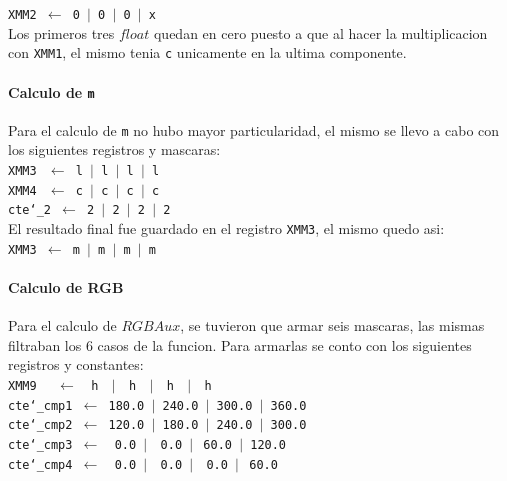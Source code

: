 \noindent
\texttt{XMM2 $\gets$ 0 $\vert$ 0 $\vert$ 0 $\vert$ x}\\

Los primeros tres $float$ quedan en cero puesto a que al hacer la multiplicacion con \texttt{XMM1}, el mismo tenia \texttt{c} unicamente en la ultima componente.

\paragraph{Calculo de \texttt{m}\newline}

Para el calculo de \texttt{m} no hubo mayor particularidad, el mismo se llevo a cabo con los siguientes registros y mascaras:\\

\noindent
\texttt{XMM3 $\ \gets$ l $\vert$ l $\vert$ l $\vert$ l}\\
\texttt{XMM4 $\ \gets$ c $\vert$ c $\vert$ c $\vert$ c}\\
\texttt{cte\char`_2 $\gets$ 2 $\vert$ 2 $\vert$ 2 $\vert$ 2}\\

El resultado final fue guardado en el registro \texttt{XMM3}, el mismo quedo asi:\\

\noindent
\texttt{XMM3 $\gets$ m $\vert$ m $\vert$ m $\vert$ m}\\

\paragraph{Calculo de RGB\newline}

Para el calculo de $RGBAux$, se tuvieron que armar seis mascaras, las mismas filtraban los 6 casos de la funcion. Para armarlas se conto con los siguientes registros y constantes:\\

\noindent
\texttt{XMM9 $\ \ \ \ \gets\ \ $ h $\ \ \vert\ \ $ h $\ \ \vert\ \ $ h $\ \ \vert\ \ $ h}\\
\texttt{cte\char`_cmp1 $\gets$ 180.0 $\vert$ 240.0 $\vert$ 300.0 $\vert$ 360.0}\\
\texttt{cte\char`_cmp2 $\gets$ 120.0 $\vert$ 180.0 $\vert$ 240.0 $\vert$ 300.0}\\
\texttt{cte\char`_cmp3 $\gets\ \ $ 0.0 $\vert\ \ $ 0.0 $\vert\ $ 60.0 $\vert$ 120.0}\\
\texttt{cte\char`_cmp4 $\gets\ \ $ 0.0 $\vert\ \ $ 0.0 $\vert\ \ $ 0.0 $\vert\ $ 60.0}\\

